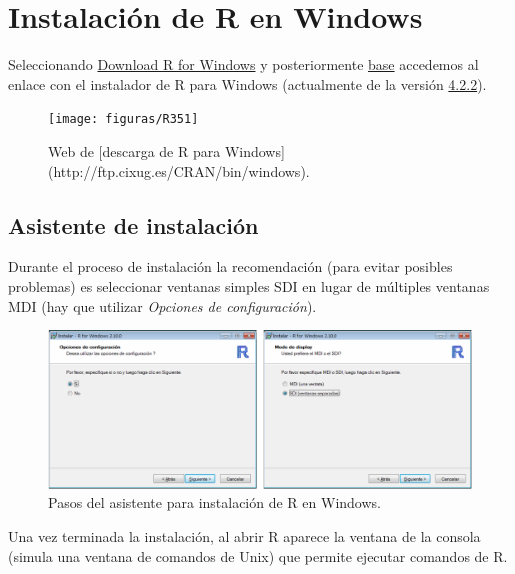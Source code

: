 \documentclass[
]{book}
\theoremstyle{break}
\theoremstyle{nonumberplain}
\begin{document}
\hypertarget{windows}{%
\section{Instalación de R en Windows}\label{windows}}

Seleccionando \href{http://ftp.cixug.es/CRAN/bin/windows/}{Download R for Windows} y posteriormente \href{http://ftp.cixug.es/CRAN/bin/windows/base/}{base} accedemos al enlace con el instalador de R para Windows (actualmente de la versión \href{http://ftp.cixug.es/CRAN/bin/windows/base/R-4.2.2-win.exe}{4.2.2}).

\begin{figure}[!htb]

{\centering \texttt{[image: figuras/R351]} 

}

\caption{Web de [descarga de R para Windows](http://ftp.cixug.es/CRAN/bin/windows).}\label{fig:rdownload}
\end{figure}

\hypertarget{asistente-de-instalaciuxf3n}{%
\subsection{Asistente de instalación}\label{asistente-de-instalaciuxf3n}}

Durante el proceso de instalación la recomendación (para evitar posibles problemas) es seleccionar ventanas simples SDI en lugar de múltiples ventanas MDI (hay que utilizar \emph{Opciones de configuración}).

\begin{figure}[!htb]

{\centering \includegraphics[width=0.9\linewidth]{figuras/asistente} 

}

\caption{Pasos del asistente para instalación de R en Windows.}\label{fig:asistente}
\end{figure}

Una vez terminada la instalación, al abrir R aparece la ventana de la consola (simula una ventana de comandos de Unix) que permite ejecutar comandos de R.
\end{document}
